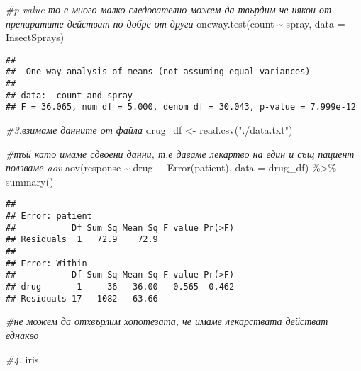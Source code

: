 \documentclass[
]{article}
\newenvironment{Shaded}{\begin{snugshade}}{\end{snugshade}}
\newcommand{\AttributeTok}[1]{\textcolor[rgb]{0.77,0.63,0.00}{#1}}
\newcommand{\CommentTok}[1]{\textcolor[rgb]{0.56,0.35,0.01}{\textit{#1}}}
\newcommand{\FunctionTok}[1]{\textcolor[rgb]{0.00,0.00,0.00}{#1}}
\newcommand{\NormalTok}[1]{#1}
\newcommand{\OtherTok}[1]{\textcolor[rgb]{0.56,0.35,0.01}{#1}}
\newcommand{\SpecialCharTok}[1]{\textcolor[rgb]{0.00,0.00,0.00}{#1}}
\newcommand{\StringTok}[1]{\textcolor[rgb]{0.31,0.60,0.02}{#1}}
\begin{document}
\begin{Shaded}
\begin{Highlighting}[]
\CommentTok{\#p{-}value{-}то е много малко следователно можем да твърдим че някои от препаратите действат по{-}добре от други}
\FunctionTok{oneway.test}\NormalTok{(count }\SpecialCharTok{\textasciitilde{}}\NormalTok{ spray, }\AttributeTok{data =}\NormalTok{ InsectSprays)}
\end{Highlighting}
\end{Shaded}

\begin{verbatim}
## 
##  One-way analysis of means (not assuming equal variances)
## 
## data:  count and spray
## F = 36.065, num df = 5.000, denom df = 30.043, p-value = 7.999e-12
\end{verbatim}

\begin{Shaded}
\begin{Highlighting}[]
\CommentTok{\#3.взимаме данните от файла}
\NormalTok{drug\_df }\OtherTok{\textless{}{-}} \FunctionTok{read.csv}\NormalTok{(}\StringTok{"./data.txt"}\NormalTok{)}

\CommentTok{\#тъй като имаме сдвоени данни, т.е даваме лекартво на един и същ пациент ползваме aov}
\FunctionTok{aov}\NormalTok{(response }\SpecialCharTok{\textasciitilde{}}\NormalTok{ drug }\SpecialCharTok{+} \FunctionTok{Error}\NormalTok{(patient), }\AttributeTok{data =}\NormalTok{ drug\_df) }\SpecialCharTok{\%\textgreater{}\%} \FunctionTok{summary}\NormalTok{()}
\end{Highlighting}
\end{Shaded}

\begin{verbatim}
## 
## Error: patient
##           Df Sum Sq Mean Sq F value Pr(>F)
## Residuals  1   72.9    72.9               
## 
## Error: Within
##           Df Sum Sq Mean Sq F value Pr(>F)
## drug       1     36   36.00   0.565  0.462
## Residuals 17   1082   63.66
\end{verbatim}

\begin{Shaded}
\begin{Highlighting}[]
\CommentTok{\#не можем да отхвърлим хопотезата, че имаме лекарствата действат еднакво}
\end{Highlighting}
\end{Shaded}

\begin{Shaded}
\begin{Highlighting}[]
\CommentTok{\#4.}
\NormalTok{iris}
\end{Highlighting}
\end{Shaded}
\end{document}
